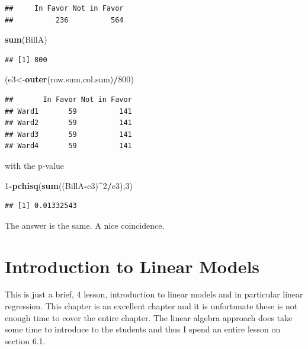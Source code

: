\documentclass[]{book}
\newenvironment{Shaded}{\begin{snugshade}}{\end{snugshade}}
\newcommand{\KeywordTok}[1]{\textcolor[rgb]{0.13,0.29,0.53}{\textbf{#1}}}
\newcommand{\DecValTok}[1]{\textcolor[rgb]{0.00,0.00,0.81}{#1}}
\newcommand{\OperatorTok}[1]{\textcolor[rgb]{0.81,0.36,0.00}{\textbf{#1}}}
\newcommand{\NormalTok}[1]{#1}
\theoremstyle{definition}
\theoremstyle{definition}
\theoremstyle{definition}
\theoremstyle{remark}
\begin{document}
\begin{verbatim}
##     In Favor Not in Favor 
##          236          564
\end{verbatim}

\begin{Shaded}
\begin{Highlighting}[]
\KeywordTok{sum}\NormalTok{(BillA)}
\end{Highlighting}
\end{Shaded}

\begin{verbatim}
## [1] 800
\end{verbatim}

\begin{Shaded}
\begin{Highlighting}[]
\NormalTok{(e3<-}\KeywordTok{outer}\NormalTok{(row.sum,col.sum)}\OperatorTok{/}\DecValTok{800}\NormalTok{)}
\end{Highlighting}
\end{Shaded}

\begin{verbatim}
##       In Favor Not in Favor
## Ward1       59          141
## Ward2       59          141
## Ward3       59          141
## Ward4       59          141
\end{verbatim}

with the p-value

\begin{Shaded}
\begin{Highlighting}[]
\DecValTok{1}\OperatorTok{-}\KeywordTok{pchisq}\NormalTok{(}\KeywordTok{sum}\NormalTok{((BillA}\OperatorTok{-}\NormalTok{e3)}\OperatorTok{^}\DecValTok{2}\OperatorTok{/}\NormalTok{e3),}\DecValTok{3}\NormalTok{)}
\end{Highlighting}
\end{Shaded}

\begin{verbatim}
## [1] 0.01332543
\end{verbatim}

The answer is the same. A nice coincidence.

\chapter{Introduction to Linear Models}\label{Chpt6}

This is just a brief, 4 lesson, introduction to linear models and in
particular linear regression. This chapter is an excellent chapter and
it is unfortunate these is not enough time to cover the entire chapter.
The linear algebra approach does take some time to introduce to the
students and thus I spend an entire lesson on section 6.1.
\end{document}

